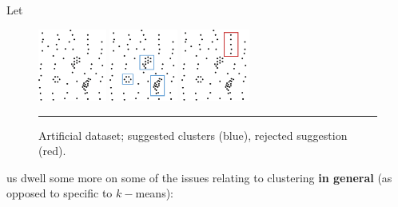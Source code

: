 \newpage\noindent Let \begin{figure}[!t]
\centering
\includegraphics[width=0.20\textwidth]{images/DSML/clustering6.png} \qquad\qquad 
\includegraphics[width=0.2\textwidth]{images/DSML/clustering7.png} \qquad\qquad
\includegraphics[width=0.2\textwidth]{images/DSML/clustering8.png} \caption[\small Cluster suggestions in an artificial dataset]{\small Artificial dataset; suggested clusters (blue), rejected suggestion (red).}\hrule\label{fig:clust678}
\end{figure}
\afterpage{\FloatBarrier}
 us dwell some more on some of the issues relating to clustering \textbf{in general} (as opposed to specific to $k-$means):
